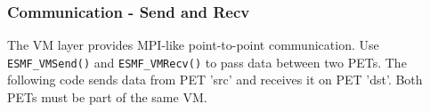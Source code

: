  
\setlength{\oldparskip}{\parskip}
\setlength{\parskip}{1.5ex}
\setlength{\oldparindent}{\parindent}
\setlength{\parindent}{0pt}
\setlength{\oldbaselineskip}{\baselineskip}
\setlength{\baselineskip}{11pt}
 
\def\bv{\begin{verbatim}}
\def\ev{\end{verbatim}}
\def\be{\begin{equation}}
\def\ee{\end{equation}}
\def\bea{\begin{eqnarray}}
\def\eea{\end{eqnarray}}
\def\bi{\begin{itemize}}
\def\ei{\end{itemize}}
\def\bn{\begin{enumerate}}
\def\en{\end{enumerate}}
\def\bd{\begin{description}}
\def\ed{\end{description}}
\def\({\left (}
\def\){\right )}
\def\[{\left [}
\def\]{\right ]}
\def\<{\left  \langle}
\def\>{\right \rangle}
\def\cI{{\cal I}}
\def\diag{\mathop{\rm diag}}
\def\tr{\mathop{\rm tr}}


 

  
   \subsubsection{Communication - Send and Recv}
  
   The VM layer provides MPI-like point-to-point communication. Use 
   {\tt ESMF\_VMSend()} and {\tt ESMF\_VMRecv()} to pass data between two PETs.
   The following code sends data from PET 'src' and receives it on PET 'dst'.
   Both PETs must be part of the same VM.
   

